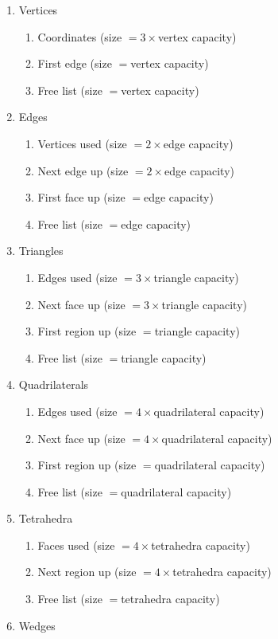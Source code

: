 \begin{enumerate}
\item Vertices
  \begin{enumerate}
  \item Coordinates (size $=3\times$vertex capacity)
  \item First edge (size $=$vertex capacity)
  \item Free list (size $=$vertex capacity)
  \end{enumerate}
\item Edges
  \begin{enumerate}
  \item Vertices used (size $=2\times$edge capacity)
  \item Next edge up (size $=2\times$edge capacity)
  \item First face up (size $=$edge capacity)
  \item Free list (size $=$edge capacity)
  \end{enumerate}
\item Triangles
  \begin{enumerate}
  \item Edges used (size $=3\times$triangle capacity)
  \item Next face up (size $=3\times$triangle capacity)
  \item First region up (size $=$triangle capacity)
  \item Free list (size $=$triangle capacity)
  \end{enumerate}
\item Quadrilaterals
  \begin{enumerate}
  \item Edges used (size $=4\times$quadrilateral capacity)
  \item Next face up (size $=4\times$quadrilateral capacity)
  \item First region up (size $=$quadrilateral capacity)
  \item Free list (size $=$quadrilateral capacity)
  \end{enumerate}
\item Tetrahedra
  \begin{enumerate}
  \item Faces used (size $=4\times$tetrahedra capacity)
  \item Next region up (size $=4\times$tetrahedra capacity)
  \item Free list (size $=$tetrahedra capacity)
  \end{enumerate}
\item Wedges

\end{enumerate}
